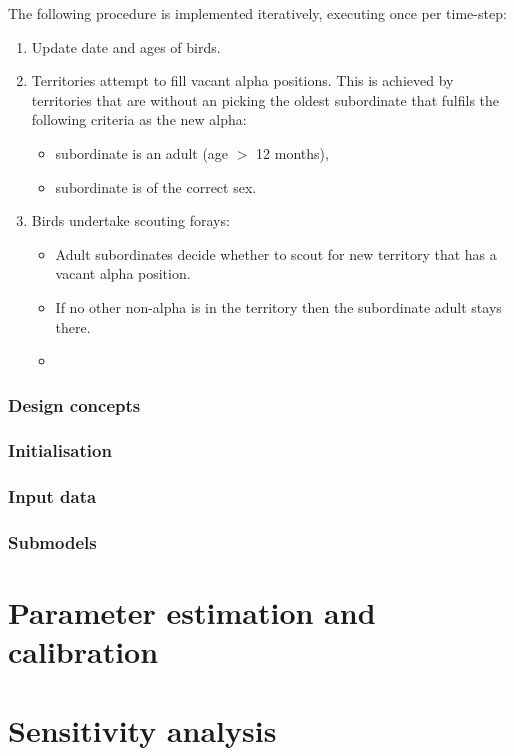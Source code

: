 The following procedure is implemented iteratively, executing once per time-step:
\begin{enumerate}
    \item Update date and ages of birds.
    \item Territories attempt to fill vacant alpha positions. This is achieved by territories that are without an picking the oldest subordinate that fulfils the following criteria as the new alpha:
    \begin{itemize}
        \item subordinate is an adult (age $>$ 12 months),
        \item subordinate is of the correct sex.
    \end{itemize}
    \item Birds undertake scouting forays:
    \begin{itemize}
        \item Adult subordinates decide whether to scout for new territory that has a vacant alpha position.
        \item If no other non-alpha is in the territory then the subordinate adult stays there.
        \item  
    \end{itemize}
\end{enumerate}


\subsubsection{Design concepts}
\label{thiele:intro:example:design}

\subsubsection{Initialisation}
\label{thiele:intro:example:intial}

\subsubsection{Input data}
\label{thiele:intro:example:input}

\subsubsection{Submodels}
\label{thiele:intro:example:submodels}

\section{Parameter estimation and calibration}
\label{thiele:parameter_estimation}

\section{Sensitivity analysis}
\label{thiele:sensitivity_analysis}

